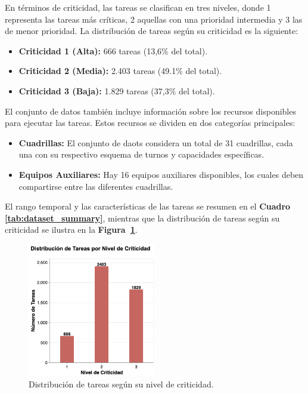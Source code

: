 \documentclass{article}
\begin{document}
En términos de criticidad, las tareas se clasifican en tres niveles, donde 1 representa las tareas más críticas, 2 aquellas con una prioridad intermedia y 3 las de menor prioridad. La distribución de tareas según su criticidad es la siguiente:
\begin{itemize}
    \item \textbf{Criticidad 1 (Alta):} 666 tareas (13,6\% del total).
    \item \textbf{Criticidad 2 (Media):} 2.403 tareas (49.1\% del total).
    \item \textbf{Criticidad 3 (Baja):} 1.829 tareas (37,3\% del total).
\end{itemize}

El conjunto de datos también incluye información sobre los recursos disponibles para ejecutar las tareas. Estos recursos se dividen en dos categorías principales:
\begin{itemize}
    \item \textbf{Cuadrillas:} El conjunto de daots considera un total de 31 cuadrillas, cada una con su respectivo esquema de turnos y capacidades específicas.
    \item \textbf{Equipos Auxiliares:} Hay 16 equipos auxiliares disponibles, los cuales deben compartirse entre las diferentes cuadrillas.
\end{itemize}

El rango temporal y las características de las tareas se resumen en el \textbf{Cuadro \ref{tab:dataset_summary}}, mientras que la distribución de tareas según su criticidad se ilustra en la \textbf{Figura~\ref{fig:barras_impacto}}.


\begin{figure}[htbp]
    \centering
    \includegraphics[width=0.5\textwidth]{imgs/barras_impacto.png}
    \caption{Distribución de tareas según su nivel de criticidad.}
    \label{fig:barras_impacto}
\end{figure}
\end{document}
